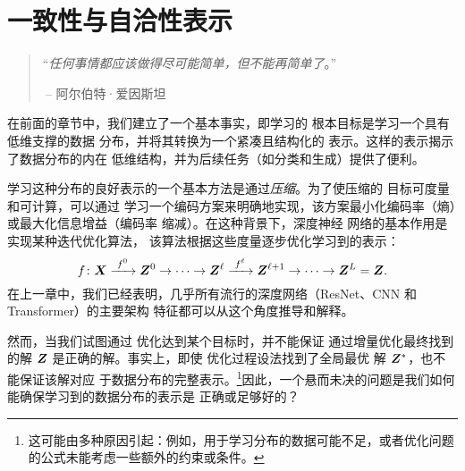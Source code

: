 \documentclass[../../book-main.tex]{subfiles}
\begin{document}
\chapter{一致性与自洽性表示}
\label{ch:consistent}\label{ch:autoencoding}
\label{ch:self-consistent}\label{ch:closed-loop}

\begin{quote}
\hfill  “{\em 任何事情都应该做得尽可能简单，但不能再简单了}。”

$~$\hfill -- 阿尔伯特·爱因斯坦
\end{quote}



\vspace{5mm}


在前面的章节中，我们建立了一个基本事实，即学习的
根本目标是学习一个具有低维支撑的数据
分布，并将其转换为一个紧凑且结构化的
表示。这样的表示揭示了数据分布的内在
低维结构，并为后续任务（如分类和生成）提供了便利。

学习这种分布的良好表示的一个基本方法是通过{\em 压缩}。为了使压缩的
目标可度量和可计算，可以通过
学习一个编码方案来明确地实现，该方案最小化编码率（熵）或最大化信息增益（编码率
缩减）。在这种背景下，深度神经
网络的基本作用是实现某种迭代优化算法，
该算法根据这些度量逐步优化学习到的表示：
\begin{equation}
  f\colon \bm{X}
  \xrightarrow{\hspace{1mm} f^0 \hspace{1mm}} \bm{Z}^0 \rightarrow \cdots
  \rightarrow \bm{Z}^\ell \xrightarrow{\hspace{1mm} f^\ell \hspace{1mm}}
  \bm{Z}^{\ell+1} \rightarrow  \cdots \to \bm{Z}^L = \bm{Z}.
\end{equation}
在上一章中，我们已经表明，几乎所有流行的深度网络（ResNet、CNN 和
Transformer）的主要架构
特征都可以从这个角度推导和解释。

然而，当我们试图通过
优化达到某个目标时，并不能保证
通过增量优化最终找到的解 $\bm{Z}$ 是正确的解。事实上，即使
优化过程设法找到了全局最优
解 $\bm{Z}^*$，也不能保证该解对应
于数据分布的完整表示。\footnote{这可能由多种原因引起：例如，用于学习分布的数据可能不足，或者优化问题的公式未能考虑一些额外的约束或条件。}因此，一个悬而未决的问题是我们如何能确保学习到的数据分布的表示是
正确或足够好的？
\end{document}
